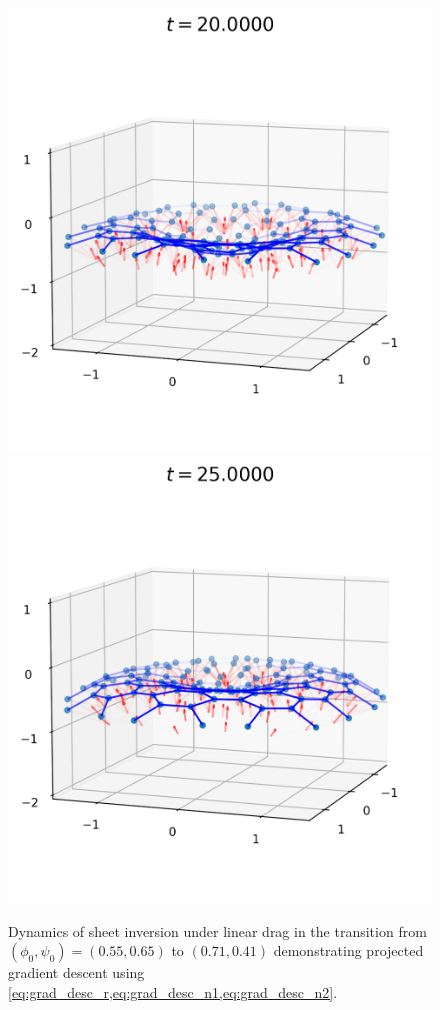 \begin{landscape}
\begin{figure}[p]
	\includegraphics[width=0.4\textheight]{dynamics/08000.png}
	\includegraphics[width=0.4\textheight]{dynamics/10000.png}
	\caption[Gradient descent equilibration and dynamics of sheet inversion]{Dynamics of sheet inversion under linear drag in the transition from $(\phi_0, \psi_0)=(0.55, 0.65)$ to $(0.71,0.41)$ demonstrating projected gradient descent using \cref{eq:grad_desc_r,eq:grad_desc_n1,eq:grad_desc_n2}.}
	\label{fig:dynamics}
\end{figure}
\end{landscape}

